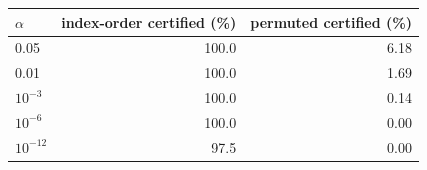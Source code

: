 \begin{tabular}{lrr}
\toprule
$\alpha$ & index-order certified (\%) & permuted certified (\%) \\
\midrule
0.05 & 100.0 & 6.18 \\
0.01 & 100.0 & 1.69 \\
$10^{-3}$ & 100.0 & 0.14 \\
$10^{-6}$ & 100.0 & 0.00 \\
$10^{-12}$ & 97.5 & 0.00 \\
\bottomrule
\end{tabular}